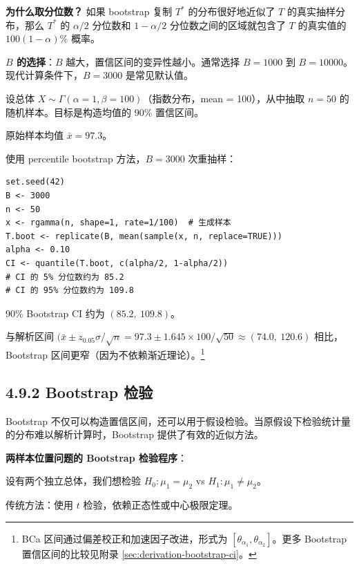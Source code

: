 \textbf{为什么取分位数？} 如果 bootstrap 复制 $T^*$ 的分布很好地近似了 $T$ 的真实抽样分布，那么 $T^*$ 的 $\alpha/2$ 分位数和 $1-\alpha/2$ 分位数之间的区域就包含了 $T$ 的真实值的 $100(1-\alpha)\%$ 概率。

\textbf{$B$ 的选择}：$B$ 越大，置信区间的变异性越小。通常选择 $B=1000$ 到 $B=10000$。现代计算条件下，$B=3000$ 是常见默认值。

\begin{example}\label{ex:gamma-bootstrap-ci}
设总体 $X \sim \Gamma(\alpha=1, \beta=100)$（指数分布，mean = 100），从中抽取 $n=50$ 的随机样本。目标是构造均值的 90\% 置信区间。

原始样本均值 $\bar{x} = 97.3$。

使用 percentile bootstrap 方法，$B=3000$ 次重抽样：

\begin{verbatim}
set.seed(42)
B <- 3000
n <- 50
x <- rgamma(n, shape=1, rate=1/100)  # 生成样本
T.boot <- replicate(B, mean(sample(x, n, replace=TRUE)))
alpha <- 0.10
CI <- quantile(T.boot, c(alpha/2, 1-alpha/2))
# CI 的 5% 分位数约为 85.2
# CI 的 95% 分位数约为 109.8
\end{verbatim}

90\% Bootstrap CI 约为 $(85.2,\ 109.8)$。

与解析区间 $(\bar{x} \pm z_{0.05} \sigma/\sqrt{n} = 97.3 \pm 1.645 \times 100/\sqrt{50} \approx (74.0,\ 120.6)$ 相比，Bootstrap 区间更窄（因为不依赖渐近理论）。\footnote{BCa 区间通过偏差校正和加速因子改进，形式为 $[\theta_{\alpha_1}, \theta_{\alpha_2}]$。更多 Bootstrap 置信区间的比较见附录 \cref{sec:derivation-bootstrap-ci}。}
\end{example}

\subsection{4.9.2 Bootstrap 检验}\label{sec:4.9.2}

Bootstrap 不仅可以构造置信区间，还可以用于假设检验。当原假设下检验统计量的分布难以解析计算时，Bootstrap 提供了有效的近似方法。

\textbf{两样本位置问题的 Bootstrap 检验程序}：

设有两个独立总体，我们想检验 $H_0: \mu_1 = \mu_2$ vs $H_1: \mu_1 \neq \mu_2$。

传统方法：使用 $t$ 检验，依赖正态性或中心极限定理。

